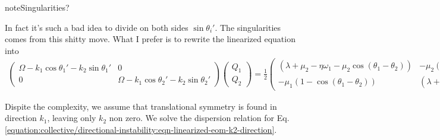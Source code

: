 \documentclass[letterpaper,12pt,english]{sphinxmanual}
\begin{document}
\begin{sphinxadmonition}{note}{Singularities?}

In fact it's such a bad idea to divide on both sides \(\sin\theta_i'\). The singularities comes from this shitty move. What I prefer is to rewrite the linearized equation into
\label{\detokenize{collective/directional-instability:equation-eqn-linearized-eom-k2-direction-non-singularity}}\begin{equation}\label{equation:collective/directional-instability:eqn-linearized-eom-k2-direction-non-singularity}
\begin{split}\begin{pmatrix}
\Omega - k_1\cos\theta_1' - k_2 \sin\theta_1' & 0\\
0 & \Omega - k_1\cos\theta_2' - k_2 \sin\theta_2'
\end{pmatrix}\begin{pmatrix}
Q_1 \\
Q_2
\end{pmatrix} =\frac{1}{2}\begin{pmatrix}
(\lambda+ \mu_2 - \eta \omega_1 - \mu_2 \cos(\theta_1-\theta_2) )  & -\mu_2 (1-\cos(\theta_1-\theta_2))  \\
-\mu_1 (1- \cos(\theta_1-\theta_2)) & (\lambda + \mu_1 - \eta \omega_2 - \mu_1 \cos(\theta_1-\theta_2) )
\end{pmatrix}\begin{pmatrix}
Q_1 \\
Q_2
\end{pmatrix}.\end{split}
\end{equation}\end{sphinxadmonition}

Dispite the complexity, we assume that translational symmetry is found in direction \(k_1\), leaving only \(k_2\) non zero. We solve the dispersion relation for Eq. \eqref{equation:collective/directional-instability:eqn-linearized-eom-k2-direction}.
\end{document}
